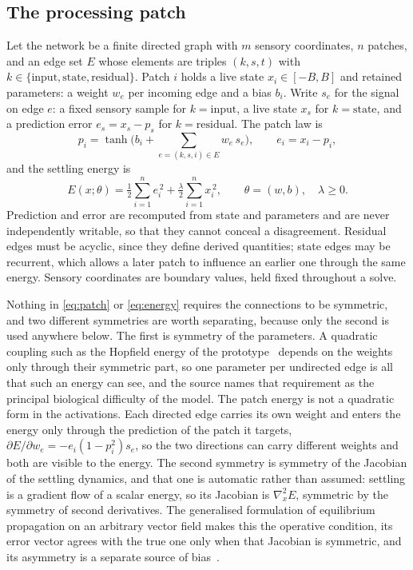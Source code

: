 \documentclass[11pt]{article}
\theoremstyle{definition}
\theoremstyle{remark}
\begin{document}
\subsection{The processing patch}
Let the network be a finite directed graph with $m$ sensory coordinates, $n$ patches, and an edge set
$E$ whose elements are triples $(k,s,t)$ with $k\in\{\text{input},\text{state},\text{residual}\}$.
Patch $i$ holds a live state $x_i\in[-B,B]$ and retained parameters: a weight $w_e$ per incoming edge
and a bias $b_i$. Write $s_e$ for the signal on edge $e$: a fixed sensory sample for $k=\text{input}$,
a live state $x_s$ for $k=\text{state}$, and a prediction error $e_s=x_s-p_s$ for
$k=\text{residual}$. The patch law is
\begin{equation}
p_i=\tanh\!\Big(b_i+\sum_{e=(k,s,i)\in E} w_e\,s_e\Big),
\qquad
e_i=x_i-p_i,
\label{eq:patch}
\end{equation}
and the settling energy is
\begin{equation}
E(x;\theta)=\tfrac12\sum_{i=1}^{n} e_i^{\,2}+\tfrac{\lambda}{2}\sum_{i=1}^{n} x_i^{\,2},
\qquad \theta=(w,b),\quad \lambda\ge 0 .
\label{eq:energy}
\end{equation}
Prediction and error are recomputed from state and parameters and are never independently writable,
so that they cannot conceal a disagreement. Residual edges must be acyclic, since they define derived
quantities; state edges may be recurrent, which allows a later patch to influence an earlier
one through the same energy. Sensory coordinates are boundary values, held fixed throughout a solve.

Nothing in \eqref{eq:patch} or \eqref{eq:energy} requires the connections to be symmetric, and two
different symmetries are worth separating, because only the second is used anywhere below. The first
is symmetry of the parameters. A quadratic coupling such as the Hopfield energy of the
prototype~\cite{scellier2017,hopfield} depends on the weights only through their symmetric part, so
one parameter per undirected edge is all that such an energy can see, and the source names that
requirement as the principal biological difficulty of the model. The patch energy is not a quadratic
form in the activations. Each directed edge carries its own weight and enters the energy only through
the prediction of the patch it targets, $\partial E/\partial w_e=-e_i(1-p_i^2)s_e$, so the two
directions can carry different weights and both are visible to the energy. The second symmetry is
symmetry of the Jacobian of the settling dynamics, and that one is automatic rather than assumed:
settling is a gradient flow of a scalar energy, so its Jacobian is $\nabla_x^2E$, symmetric by the
symmetry of second derivatives. The generalised formulation of equilibrium propagation on an arbitrary
vector field makes this the operative condition, its error vector agrees with the true one only when
that Jacobian is symmetric, and its asymmetry is a separate source of
bias~\cite{scellier2018,laborieux2024}.
\end{document}
